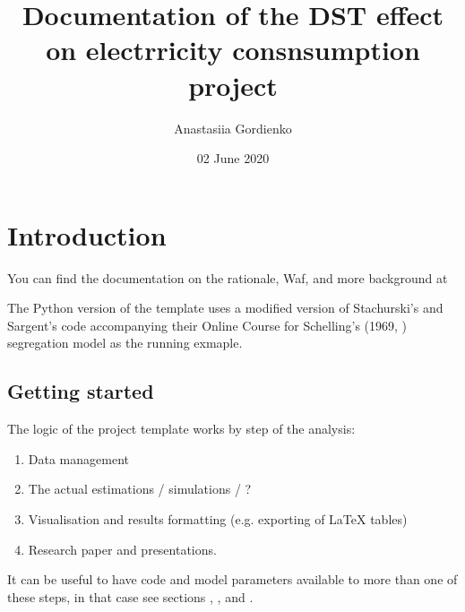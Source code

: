 \documentclass[a4paper,11pt,english]{sphinxmanual}
\title{Documentation of the DST effect on electrricity consnsumption
        project}
\date{02 June 2020}
\author{Anastasiia Gordienko}
\begin{document}
\pagestyle{empty}
\sphinxmaketitle
\pagestyle{plain}
\sphinxtableofcontents
\pagestyle{normal}
\label{\detokenize{index::doc}}



\chapter{Introduction}
\label{\detokenize{introduction:introduction}}\label{\detokenize{introduction:id1}}\label{\detokenize{introduction::doc}}
You can find the documentation on the rationale, Waf, and more background at 

The Python version of the template uses a modified version of Stachurski’s and Sargent’s code accompanying their Online Course  for Schelling’s (1969, ) segregation model as the running exmaple.


\section{Getting started}
\label{\detokenize{introduction:getting-started}}\label{\detokenize{introduction:id4}}

The logic of the project template works by step of the analysis:
\begin{enumerate}
%
\item {} 
Data management

\item {} 
The actual estimations / simulations / ?

\item {} 
Visualisation and results formatting (e.g. exporting of LaTeX tables)

\item {} 
Research paper and presentations.

\end{enumerate}

It can be useful to have code and model parameters available to more than one of these steps, in that case see sections {\hyperref[\detokenize{model_specs:model-specifications}]{}}, {\hyperref[\detokenize{model_code:model-code}]{}}, and {\hyperref[\detokenize{library:library}]{}}.
\end{document}
